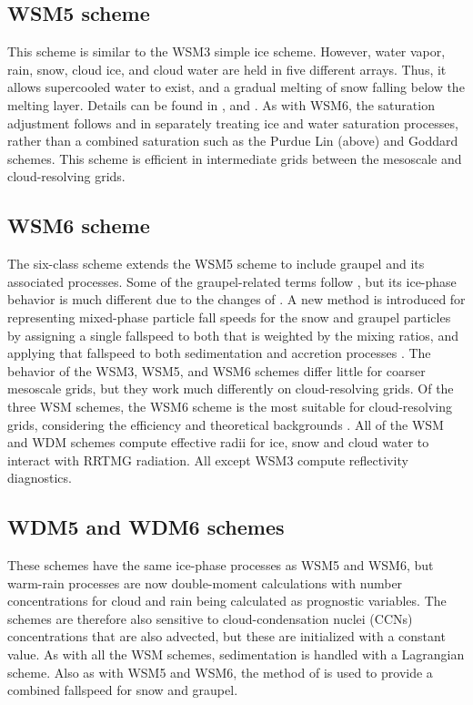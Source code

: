 \subsection{WSM5 scheme}

This scheme is similar to the WSM3 simple ice scheme. However, water vapor, rain, snow, cloud ice,
and cloud water are held in five different arrays. Thus, it allows supercooled water to exist, and
a gradual melting of snow falling below the melting layer. Details can be found in 
\citet{hong04}, and \citet{honglim06}. As with WSM6, the saturation adjustment follows \citet{dudhia89} and \citet{hong98} in separately treating ice and water saturation processes, rather than a combined saturation such as the Purdue Lin (above) and Goddard \citep{tao89} schemes. This scheme is efficient in intermediate grids between the mesoscale and cloud-resolving grids.

\subsection{WSM6 scheme}

The six-class scheme extends the WSM5 scheme to include graupel and its associated processes.
Some of the graupel-related terms follow \citet{lin83}, but its ice-phase behavior is much different due to the changes of \citet{hong04}. A new method is introduced for representing mixed-phase particle fall speeds for the snow and graupel particles by assigning a single fallspeed to both that is weighted by the mixing ratios, and applying that fallspeed to both sedimentation and accretion processes \citep{dudhia08}. The behavior of the WSM3, WSM5, and WSM6 schemes differ little for coarser mesoscale grids, but they work much differently on cloud-resolving grids. Of the three WSM schemes, the WSM6 scheme is the most suitable for cloud-resolving grids, considering the efficiency and theoretical backgrounds \citep{honglim06}. All of the WSM and WDM schemes compute effective radii for ice, snow and cloud water to interact with RRTMG radiation. All except WSM3 compute reflectivity diagnostics.

\subsection{WDM5 and WDM6 schemes}

These schemes have the same ice-phase processes as WSM5 and WSM6, but warm-rain processes are now double-moment calculations \citep{lim10} with number concentrations for cloud and rain being calculated as prognostic variables. The schemes are therefore also sensitive to cloud-condensation nuclei (CCNs) concentrations that are also advected, but these are initialized with a constant value. As with all the WSM schemes, sedimentation is handled with a Lagrangian scheme. Also as with WSM5 and WSM6, the method of \citet{dudhia08} is used
to provide a combined fallspeed for snow and graupel.

